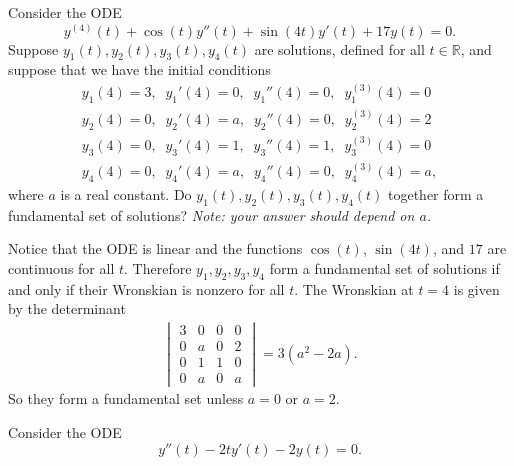 \documentclass[addpoints]{exam}
\newcommand{\R}{\mathbb{R}}
\begin{document}
\begin{questions}
\begin{question}[10]
Consider the ODE $$ y^{(4)}(t) + \cos(t)y''(t) + \sin(4t)y'(t) + 17y(t) = 0.$$
Suppose $y_1(t),y_2(t),y_3(t),y_4(t)$ are solutions, defined for all $t \in \R$, and suppose that we have the initial conditions
\begin{align*}
y_1(4) = 3,\;\; y_1'(4) = 0,\;\; y_1''(4) = 0,\;\; y_1^{(3)}(4) = 0\\
y_2(4) = 0,\;\; y_2'(4) = a,\;\; y_2''(4) = 0,\;\; y_2^{(3)}(4) = 2\\
y_3(4) = 0,\;\; y_3'(4) = 1,\;\; y_3''(4) = 1,\;\; y_3^{(3)}(4) = 0\\
y_4(4) = 0,\;\; y_4'(4) = a,\;\; y_4''(4) = 0,\;\; y_4^{(3)}(4) = a,
\end{align*}
where $a$ is a real constant. 
Do $y_1(t),y_2(t),y_3(t),y_4(t)$ together form a fundamental set of solutions? {\em Note: your answer should depend on $a$.}

\end{question}

\begin{solution}

Notice that the ODE is linear and the functions $\cos(t)$, $\sin(4t)$, and $17$ are continuous for all $t$. 
Therefore $y_1,y_2,y_3,y_4$ form a fundamental set of solutions if and only if their Wronskian is nonzero for all $t$.
The Wronskian at $t=4$ is given by the determinant
\begin{align*}
\begin{vmatrix} 3 & 0 &0 &0\\ 0 & a & 0 & 2 \\ 0 & 1 & 1& 0\\ 0 & a & 0 & a \end{vmatrix} = 3(a^2 - 2a).
\end{align*}
So they form a fundamental set unless $a = 0$ or $a = 2$.

\end{solution}

\break

\begin{question}

Consider the ODE $$y''(t) - 2ty'(t) - 2y(t) = 0.$$

\end{question}
\end{questions}
\end{document}
